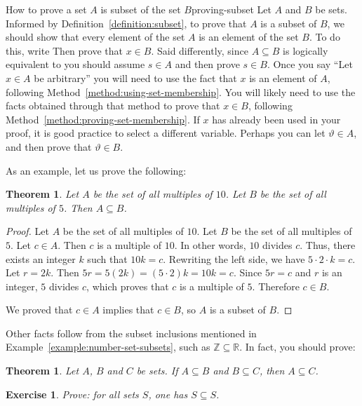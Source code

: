 \documentclass{book}
\newcounter{ekcounter}%
\theoremstyle{ekimcustom}
\newtheorem{theorem}[ekcounter]{Theorem}
\newtheorem{exercise}[ekcounter]{Exercise}
\begin{document}
\begin{bmethod}{How to prove a set $A$ is subset of the set $B$}{proving-subset}
Let $A$ and $B$ be sets. Informed by Definition~\ref{definition:subset}, to prove that $A$ is a subset of $B$, we should show that every element of the set $A$ is an element of the set $B$. To do this, write  Then prove that $x \in B$. Said differently, since $A \subseteq B$ is logically equivalent to  you should assume $s \in A$ and then prove $s \in B$.
\vskip6pt
Once you say ``Let $x \in A$ be arbitrary'' you will need to use the fact that $x$ is an element of $A$, following Method~\ref{method:using-set-membership}. You will likely need to use the facts obtained through that method to prove that $x \in B$, following Method~\ref{method:proving-set-membership}.
\vskip6pt
If $x$ has already been used in your proof, it is good practice to select a different variable. Perhaps you can let $\vartheta \in A$, and then prove that $\vartheta \in B$.
\end{bmethod}
As an example, let us prove the following:
\begin{theorem}\label{theorem:subset-10-5}
Let $A$ be the set of all multiples of $10$. Let $B$ be the set of all multiples of $5$. Then $A \subseteq B$.
\end{theorem}
\begin{proof}
Let $A$ be the set of all multiples of $10$. Let $B$ be the set of all multiples of $5$. Let $c \in A$. Then $c$ is a multiple of $10$. In other words, $10$ divides $c$. Thus, there exists an integer $k$ such that $10k=c$. Rewriting the left side, we have $5 \cdot 2 \cdot k=c$. Let $r=2k$. Then $5r=5(2k)=(5\cdot2)k=10k=c$. Since $5r=c$ and $r$ is an integer, $5$ divides $c$, which proves that $c$ is a multiple of $5$. Therefore $c \in B$.

We proved that $c \in A$ implies that $c \in B$, so $A$ is a subset of $B$.
\end{proof}

Other facts follow from the subset inclusions mentioned in Example~\ref{example:number-set-subsets}, such as $\mathbb{Z} \subseteq \mathbb{R}$. In fact, you should prove:
\begin{theorem}
Let $A$, $B$ and $C$ be sets. If $A \subseteq B$ and $B \subseteq C$, then $A \subseteq C$.
\end{theorem}
\begin{exercise}
Prove: for all sets $S$, one has $S \subseteq S$.
\end{exercise}
\end{document}
